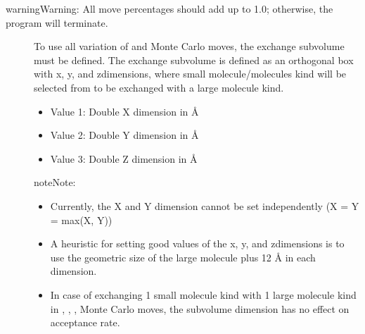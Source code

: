 \documentclass[letterpaper,10pt,english]{sphinxmanual}
\begin{document}
\begin{sphinxadmonition}{warning}{Warning:}
\sphinxAtStartPar
All move percentages should add up to 1.0; otherwise, the program will terminate.
\end{sphinxadmonition}
\begin{description}
\item[{}] \leavevmode
\sphinxAtStartPar
To use all variation of  and  Monte Carlo moves, the exchange sub\sphinxhyphen{}volume must be defined. The exchange sub\sphinxhyphen{}volume is defined as an orthogonal box with x\sphinxhyphen{}, y\sphinxhyphen{}, and z\sphinxhyphen{}dimensions, where small molecule/molecules kind will be selected from to be exchanged with a large molecule kind.
\begin{itemize}
\item {} 
\sphinxAtStartPar
Value 1: Double \sphinxhyphen{} X dimension in \(Å\)

\item {} 
\sphinxAtStartPar
Value 2: Double \sphinxhyphen{} Y dimension in \(Å\)

\item {} 
\sphinxAtStartPar
Value 3: Double \sphinxhyphen{} Z dimension in \(Å\)

\end{itemize}

\begin{sphinxadmonition}{note}{Note:}\begin{itemize}
\item {} 
\sphinxAtStartPar
Currently, the X and Y dimension cannot be set independently (X = Y = max(X, Y))

\item {} 
\sphinxAtStartPar
A heuristic for setting good values of the x\sphinxhyphen{}, y\sphinxhyphen{}, and z\sphinxhyphen{}dimensions is to use the geometric size of the large molecule plus 1\sphinxhyphen{}2 Å in each dimension.

\item {} 
\sphinxAtStartPar
In case of exchanging 1 small molecule kind with 1 large molecule kind in , , ,  Monte Carlo moves, the sub\sphinxhyphen{}volume dimension has no effect on acceptance rate.


\end{itemize}
\end{sphinxadmonition}
\end{description}
\end{document}
